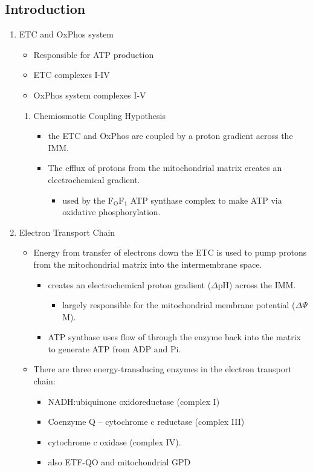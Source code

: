 \documentclass{scrartcl}
\begin{document}
\subsection{Introduction}
\label{sec:org3c7e0e6}
\begin{enumerate}
\item ETC and OxPhos system
\label{sec:org318dc32}
\begin{itemize}
\item Responsible for ATP production
\item ETC complexes I-IV
\item OxPhos system complexes I-V
\end{itemize}
\begin{enumerate}
\item Chemiosmotic Coupling Hypothesis
\label{sec:org8c4b559}
\begin{itemize}
\item the ETC and OxPhos are coupled by a proton gradient across the IMM.
\item The efflux of protons from the mitochondrial matrix creates an electrochemical gradient.
\begin{itemize}
\item used by the F\(_{\text{O}}\)F\(_{\text{1}}\) ATP synthase complex to make ATP via oxidative phosphorylation.
\end{itemize}
\end{itemize}
\end{enumerate}
\item Electron Transport Chain
\label{sec:org360fc2d}
\begin{itemize}
\item Energy from transfer of electrons down the ETC is used to pump
protons from the mitochondrial matrix into the intermembrane space.
\begin{itemize}
\item creates an electrochemical proton gradient (\(\Delta\)pH) across the IMM.
\begin{itemize}
\item largely responsible for the mitochondrial membrane potential (\(\Delta \Psi\)M).
\end{itemize}
\item ATP synthase uses flow of  through the enzyme back into the
matrix to generate ATP from ADP and Pi.
\end{itemize}
\item There are three energy-transducing enzymes in the electron transport
chain:
\begin{itemize}
\item NADH:ubiquinone oxidoreductase (complex I)
\item Coenzyme Q – cytochrome c reductase (complex III)
\item cytochrome c oxidase (complex IV).
\item also ETF-QO and mitochondrial GPD
\end{itemize}
\end{itemize}


\end{enumerate}
\end{document}
